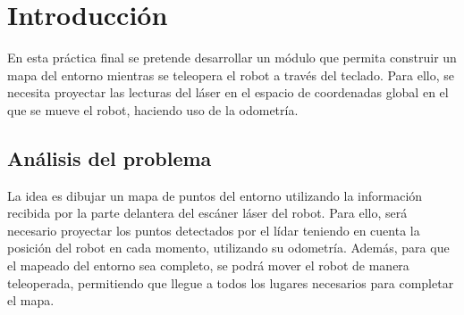 \section{Introducción}

En esta práctica final se pretende desarrollar un módulo que permita construir un mapa del entorno mientras se teleopera el robot a través del teclado. Para ello, se necesita proyectar las lecturas del láser en el espacio de coordenadas global en el que se mueve el robot, haciendo uso de la odometría.

\subsection{Análisis del problema}

La idea es dibujar un mapa de puntos del entorno utilizando la información recibida por la parte delantera del escáner láser del robot. Para ello, será necesario proyectar los puntos detectados por el lídar teniendo en cuenta la posición del robot en cada momento, utilizando su odometría. Además, para que el mapeado del entorno sea completo, se podrá mover el robot de manera teleoperada, permitiendo que llegue a todos los lugares necesarios para completar el mapa.
